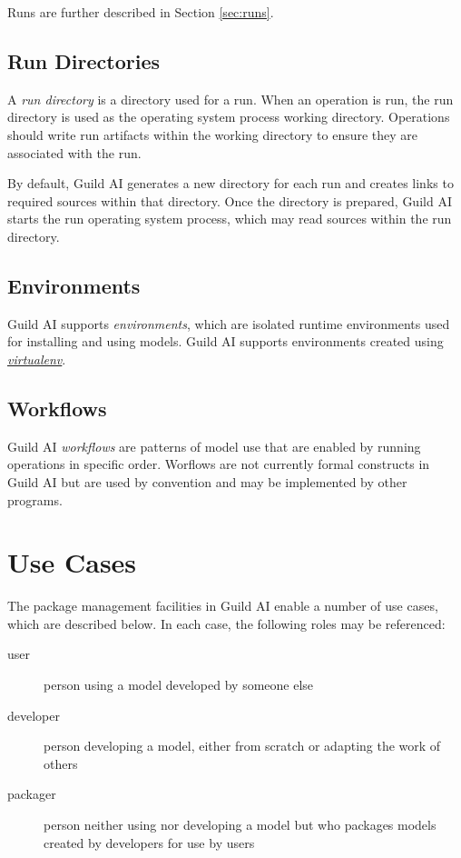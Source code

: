 \documentclass{article}
\begin{document}
Runs are further described in Section \ref{sec:runs}.

\subsection{Run Directories}
\label{sec:run-dir}

A \emph{run directory} is a directory used for a run. When an
operation is run, the run directory is used as the operating system
process working directory. Operations should write run artifacts
within the working directory to ensure they are associated with the
run.

By default, Guild AI generates a new directory for each run and
creates links to required sources within that directory. Once the
directory is prepared, Guild AI starts the run operating system
process, which may read sources within the run directory.

\subsection{Environments}

Guild AI supports \emph{environments}, which are isolated runtime
environments used for installing and using models. Guild AI supports
environments created using
\href{https://virtualenv.pypa.io}{\emph{virtualenv}}.

\subsection{Workflows}

Guild AI \emph{workflows} are patterns of model use that are enabled
by running operations in specific order. Worflows are not currently
formal constructs in Guild AI but are used by convention and may be
implemented by other programs.

\section{Use Cases}
\label{sec:use-cases}

The package management facilities in Guild AI enable a number of use
cases, which are described below. In each case, the following roles
may be referenced:

\begin{description}
\item[user] person using a model developed by someone else
\item[developer] person developing a model, either from scratch or
  adapting the work of others
\item[packager] person neither using nor developing a model but who
  packages models created by developers for use by users
\end{description}
\end{document}

